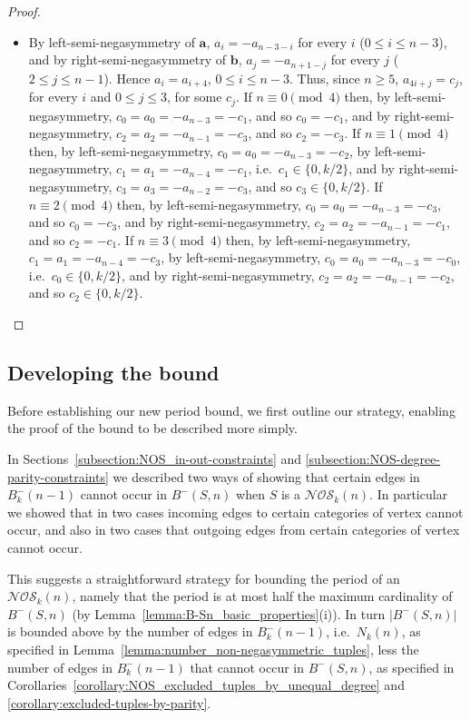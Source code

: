 \documentclass[a4paper,11pt]{article}
\theoremstyle{plain}
\theoremstyle{definition}
\theoremstyle{remark}
\begin{document}
\begin{proof}
\begin{itemize}
\item[iv)] By left-semi-negasymmetry of $\mathbf{a}$, $a_i=-a_{n-3-i}$ for every $i$ ($0\leq
    i\leq n-3$), and by right-semi-negasymmetry of $\mathbf{b}$, $a_{j}=-a_{n+1-j}$ for every
    $j$ ($2\leq j\leq n-1$).  Hence $a_i=a_{i+4}$, $0\leq i\leq n-3$.  Thus, since $n\geq5$,
    $a_{4i+j}=c_j$, for every $i$ and $0\leq j\leq 3$, for some $c_j$.
     \newline If $n\equiv0\pmod4$ then, by left-semi-negasymmetry, $c_0=a_0=-a_{n-3}=-c_1$, and so
    $c_0=-c_1$, and by right-semi-negasymmetry, $c_2=a_2=-a_{n-1}=-c_3$, and so $c_2=-c_3$.
     \newline If $n\equiv1\pmod4$ then, by left-semi-negasymmetry, $c_0=a_0=-a_{n-3}=-c_2$, by
    left-semi-negasymmetry, $c_1=a_1=-a_{n-4}=-c_1$, i.e.\ $c_1\in\{0,k/2\}$, and by
    right-semi-negasymmetry, $c_3=a_3=-a_{n-2}=-c_3$, and so $c_3\in\{0,k/2\}$.
     \newline If $n\equiv2\pmod4$ then, by left-semi-negasymmetry, $c_0=a_0=-a_{n-3}=-c_3$, and so
    $c_0=-c_3$, and by right-semi-negasymmetry, $c_2=a_2=-a_{n-1}=-c_1$, and so $c_2=-c_1$.
     \newline If $n\equiv3\pmod4$ then, by left-semi-negasymmetry, $c_1=a_1=-a_{n-4}=-c_3$, by
    left-semi-negasymmetry, $c_0=a_0=-a_{n-3}=-c_0$, i.e.\ $c_0\in\{0,k/2\}$, and by
    right-semi-negasymmetry, $c_2=a_2=-a_{n-1}=-c_2$, and so $c_2\in\{0,k/2\}$.

\end{itemize}
\end{proof}

\subsection{Developing the bound}

Before establishing our new period bound, we first outline our strategy, enabling the proof of the
bound to be described more simply.

In Sections~\ref{subsection:NOS_in-out-constraints} and
\ref{subsection:NOS-degree-parity-constraints} we described two ways of showing that certain edges
in $B^-_k(n-1)$ cannot occur in $B^-(S,n)$ when $S$ is a $\mathcal{NOS}_k(n)$.  In particular we
showed that in two cases incoming edges to certain categories of vertex cannot occur, and also in
two cases that outgoing edges from certain categories of vertex cannot occur.

This suggests a straightforward strategy for bounding the period of an $\mathcal{NOS}_k(n)$, namely
that the period is at most half the maximum cardinality of $B^-(S,n)$ (by
Lemma~\ref{lemma:B-Sn_basic_properties}(i)).  In turn $|B^-(S,n)|$ is bounded above by the number
of edges in $B^-_k(n-1)$, i.e.\ $N_k(n)$, as specified in
Lemma~\ref{lemma:number_non-negasymmetric_tuples}, less the number of edges in $B^-_k(n-1)$ that
cannot occur in $B^-(S,n)$, as specified in
Corollaries~\ref{corollary:NOS_excluded_tuples_by_unequal_degree} and
\ref{corollary:excluded-tuples-by-parity}.
\end{document}
